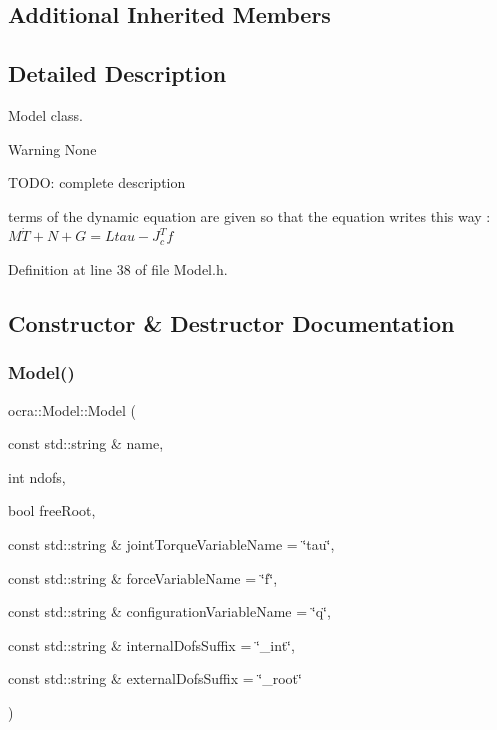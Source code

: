 \subsection*{Additional Inherited Members}


\subsection{Detailed Description}
Model class. 

\begin{DoxyWarning}{Warning}
None
\end{DoxyWarning}
T\+O\+DO\+: complete description

terms of the dynamic equation are given so that the equation writes this way \+: $ M\dot{T} + N + G = L tau - J_c^T f $ 

Definition at line 38 of file Model.\+h.



\subsection{Constructor \& Destructor Documentation}
\hypertarget{classocra_1_1Model_a409a72ebb3fb454dc12e6e91d8495715}{}\label{classocra_1_1Model_a409a72ebb3fb454dc12e6e91d8495715} 
\subsubsection{\texorpdfstring{Model()}{Model()}}
{\footnotesize\ttfamily ocra\+::\+Model\+::\+Model (\begin{DoxyParamCaption}\item[{const std\+::string \&}]{name,  }\item[{int}]{ndofs,  }\item[{bool}]{free\+Root,  }\item[{const std\+::string \&}]{joint\+Torque\+Variable\+Name = {\ttfamily \char`\"{}tau\char`\"{}},  }\item[{const std\+::string \&}]{force\+Variable\+Name = {\ttfamily \char`\"{}f\char`\"{}},  }\item[{const std\+::string \&}]{configuration\+Variable\+Name = {\ttfamily \char`\"{}q\char`\"{}},  }\item[{const std\+::string \&}]{internal\+Dofs\+Suffix = {\ttfamily \char`\"{}\+\_\+int\char`\"{}},  }\item[{const std\+::string \&}]{external\+Dofs\+Suffix = {\ttfamily \char`\"{}\+\_\+root\char`\"{}} }\end{DoxyParamCaption})}



